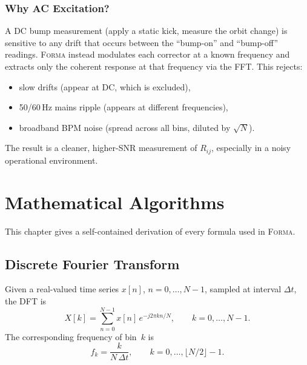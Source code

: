 \documentclass[11pt,a4paper,twoside]{report}
\newcommand{\forma}{\textsc{Forma}}
\begin{document}
\subsection{Why AC Excitation?}

A DC bump measurement (apply a static kick, measure the orbit change) is sensitive to any drift that occurs between the ``bump-on'' and ``bump-off'' readings. \forma{} instead modulates each corrector at a known frequency and extracts only the coherent response at that frequency via the FFT. This rejects:

\begin{itemize}
  \item slow drifts (appear at DC, which is excluded),
  \item 50/60\,Hz mains ripple (appears at different frequencies),
  \item broadband BPM noise (spread across all bins, diluted by $\sqrt{N}$).
\end{itemize}

The result is a cleaner, higher-SNR measurement of $R_{ij}$, especially in a noisy operational environment.


\chapter{Mathematical Algorithms}\label{ch:math}

This chapter gives a self-contained derivation of every formula used in \forma{}.

\section{Discrete Fourier Transform}\label{sec:dft}

Given a real-valued time series $x[n]$, $n=0,\dots,N{-}1$, sampled at interval $\Delta t$, the DFT is
\begin{equation}\label{eq:dft}
  X[k] = \sum_{n=0}^{N-1} x[n]\,e^{-j2\pi kn/N},
  \qquad k=0,\dots,N{-}1.
\end{equation}
The corresponding frequency of bin~$k$ is
\begin{equation}\label{eq:freq}
  f_k = \frac{k}{N\,\Delta t}, \qquad k=0,\dots,\lfloor N/2\rfloor - 1.
\end{equation}
\end{document}
